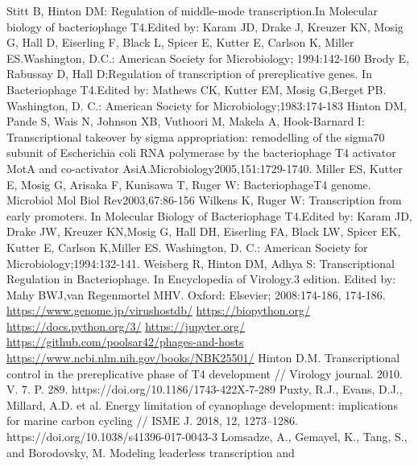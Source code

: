 \documentclass[14pt]{extarticle}
\begin{document}
\newpage
\begin{thebibliography}{9}
     {Stitt B, Hinton DM: Regulation of middle-mode transcription.In Molecular biology  of  
    bacteriophage  T4.Edited by: Karam JD, Drake J, Kreuzer KN, Mosig G, Hall D, Eiserling F, Black L, Spicer E, Kutter 
    E, Carlson K, Miller ES.Washington, D.C.: American Society for Microbiology; 1994:142-160}
     {Brody E, Rabussay D, Hall D:Regulation of transcription of prereplicative genes. In Bacteriophage
    T4.Edited by: Mathews CK, Kutter EM, Mosig G,Berget PB. Washington, D. C.: American Society for 
    Microbiology;1983:174-183}
     Hinton DM, Pande S, Wais N, Johnson XB, Vuthoori M, Makela A, Hook-Barnard I: Transcriptional 
    takeover by sigma appropriation: remodelling of the sigma70 subunit of Escherichia coli RNA polymerase by the 
    bacteriophage T4 activator MotA and co-activator AsiA.Microbiology2005,151:1729-1740.
     Miller ES, Kutter E, Mosig G, Arisaka F, Kunisawa T, Ruger W: BacteriophageT4 genome. Microbiol  
    Mol  Biol  Rev2003,67:86-156
     Wilkens K, Ruger W: Transcription from early promoters. In Molecular Biology  of  Bacteriophage  
    T4.Edited by: Karam JD, Drake JW, Kreuzer KN,Mosig G, Hall DH, Eiserling FA, Black LW, Spicer EK, Kutter E, Carlson 
    K,Miller ES. Washington, D. C.: American Society for Microbiology;1994:132-141.
     Weisberg R, Hinton DM, Adhya S: Transcriptional Regulation in Bacteriophage. In Encyclopedia  of  
    Virology.3 edition. Edited by: Mahy BWJ,van Regenmortel MHV. Oxford: Elsevier; 2008:174-186, 174-186.
     \url{https://www.genome.jp/virushostdb/}
     \url{https://biopython.org/}
     \url{https://docs.python.org/3/}
     \url{https://jupyter.org/}
     \url{https://github.com/poolsar42/phages-and-hosts}
     \url{https://www.ncbi.nlm.nih.gov/books/NBK25501/}
     Hinton D.M. Transcriptional control in the prereplicative phase of T4 development // Virology
    journal. 2010. V. 7. P. 289. https://doi.org/10.1186/1743-422X-7-289
     Puxty, R.J., Evans, D.J., Millard, A.D. et al. Energy limitation of cyanophage development:
    implications for marine carbon cycling // ISME J. 2018, 12, 1273–1286. https://doi.org/10.1038/s41396-017-0043-3
     Lomsadze, A., Gemayel, K., Tang, S., and Borodovsky, M. Modeling leaderless transcription and

\end{thebibliography}
\end{document}
